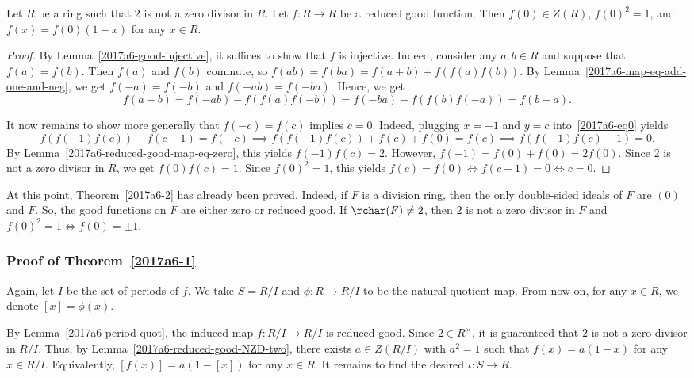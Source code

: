 \begin{lemma}\label{2017a6-reduced-good-NZD-two}
Let $R$ be a ring such that $2$ is not a zero divisor in $R$.
Let $f : R \to R$ be a reduced good function.
Then $f(0) \in Z(R)$, $f(0)^2 = 1$, and $f(x) = f(0) (1 - x)$ for any $x \in R$.
\end{lemma}
\begin{proof}
By Lemma~\ref{2017a6-good-injective}, it suffices to show that $f$ is injective.
Indeed, consider any $a, b \in R$ and suppose that $f(a) = f(b)$.
Then $f(a)$ and $f(b)$ commute, so $f(ab) = f(ba) = f(a + b) + f(f(a) f(b))$.
By Lemma~\ref{2017a6-map-eq-add-one-and-neg}, we get $f(-a) = f(-b)$ and $f(-ab) = f(-ba)$.
Hence, we get
\[ f(a - b) = f(-ab) - f(f(a) f(-b)) = f(-ba) - f(f(b) f(-a)) = f(b - a). \]

It now remains to show more generally that $f(-c) = f(c)$ implies $c = 0$.
Indeed, plugging $x = -1$ and $y = c$ into~\eqref{2017a6-eq0} yields
\[ f(f(-1) f(c)) + f(c - 1) = f(-c) \implies f(f(-1) f(c)) + f(c) + f(0) = f(c) \implies f(f(-1) f(c) - 1) = 0. \]
By Lemma~\ref{2017a6-reduced-good-map-eq-zero}, this yields $f(-1) f(c) = 2$.
However, $f(-1) = f(0) + f(0) = 2 f(0)$.
Since $2$ is not a zero divisor in $R$, we get $f(0) f(c) = 1$.
Since $f(0)^2 = 1$, this yields $f(c) = f(0) \iff f(c + 1) = 0 \iff c = 0$.
\end{proof}

At this point, Theorem~\ref{2017a6-2} has already been proved.
Indeed, if $F$ is a division ring, then the only double-sided ideals of $F$ are $(0)$ and $F$.
So, the good functions on $F$ are either zero or reduced good.
If $\rchar(F) \neq 2$, then $2$ is not a zero divisor in $F$ and $f(0)^2 = 1 \iff f(0) = \pm 1$.



\subsubsection*{Proof of Theorem~\ref{2017a6-1}}

Again, let $I$ be the set of periods of $f$.
We take $S = R/I$ and $\phi : R \to R/I$ to be the natural quotient map.
From now on, for any $x \in R$, we denote $[x] = \phi(x)$.

By Lemma~\ref{2017a6-period-quot}, the induced map $\tilde{f} : R/I \to R/I$ is reduced good.
Since $2 \in R^{\times}$, it is guaranteed that $2$ is not a zero divisor in $R/I$.
Thus, by Lemma~\ref{2017a6-reduced-good-NZD-two}, there exists $a \in Z(R/I)$ with $a^2 = 1$ such that $\tilde{f}(x) = a(1 - x)$ for any $x \in R/I$.
Equivalently, $[f(x)] = a(1 - [x])$ for any $x \in R$.
It remains to find the desired $\iota : S \to R$.

